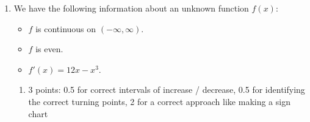\documentclass{article}
\begin{document}
\begin{enumerate}
  \begin{solution}
    Let's start by writing the definition of the derivative.
    \begin{align*}
      g'(x) &= \lim_{h \to 0} \frac{g(x+h) - g(x)}{h} \\
      &= \lim_{h \to 0} \frac{a(x+h)^3 + b(x+h) - (ax^3+bx)}{h} \\
      \intertext{Now we can expand and simplify.}
      &= \lim_{h \to 0} \frac{a(x+h)^2(x+h) + b(x+h) - (ax^3+bx)}{h} \\
      &= \lim_{h \to 0} \frac{a(x^2+2xh+h^2)(x+h) + b(x+h) - (ax^3+bx)}{h} \\
      &= \lim_{h \to 0} \frac{a(x^3+3x^2h+3xh^2+h^3) + b(x+h) - (ax^3+bx)}{h} \\
      &= \lim_{h \to 0} \frac{ax^3+3ax^2h+3axh^2+ah^3 + bx+bh - ax^3-bx}{h} \\
      &= \lim_{h \to 0} \frac{3ax^2h+3axh^2+ah^3 + bh}{h} \\
      \intertext{Now we can factor and cancel $h$.}
      &= \lim_{h \to 0} \frac{h(3ax^2+3axh+ah^2 + b)}{h} \\
      &= \lim_{h \to 0} (3ax^2+3axh+ah^2 + b) \\
      \intertext{Now we use direct substitution to evaluate the limit.}
      &= 3ax^2+3ax(0)+a(0)^2 + b \\
      &= \boxed{3ax^2 + b}
    \end{align*}
  \end{solution}

\item \label{sketch-from-cubic-derivative-1}
  We have the following information about an unknown function $f(x)$:
  \begin{itemize}[nosep]
  \item $f$ is continuous on $(-\infty, \infty)$.
  \item $f$ is even.
  \item $f'(x) = 12x - x^3$.
  \end{itemize}

  \begin{enumerate}
  \item \label{sketch-from-cubic-derivative-1-increase-decrease}

    \begin{grading}
      3 points: 0.5 for correct intervals of increase / decrease, 0.5 for identifying the correct turning points, 2 for a correct approach like making a sign chart 
    \end{grading}


\end{enumerate}
\end{enumerate}
\end{document}
